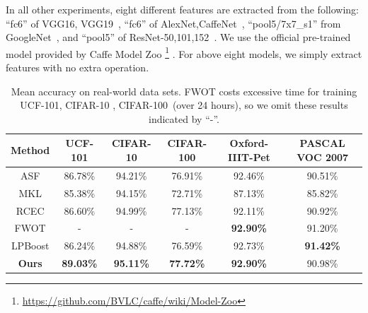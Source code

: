 \documentclass[10pt,twocolumn,letterpaper]{article}
\begin{document}
In all other experiments, eight different features are extracted from the following:
``fc6'' of VGG16, VGG19~\cite{chatfield2014return},
``fc6'' of AlexNet,CaffeNet~\cite{krizhevsky2012imagenet},
``pool5/7x7\_s1'' from GoogleNet~\cite{szegedy2015going},
and ``pool5'' of ResNet-50,101,152~\cite{he2015deep}.
We use the official pre-trained model provided by Caffe Model Zoo
\footnote{\url{https://github.com/BVLC/caffe/wiki/Model-Zoo}}
.
For above eight models, we simply extract features with no extra operation.

\begin{table}[t]
\centering
\begin{tabular}{|c|c|c|c|c|c|}
\hline
Method              & UCF-101          & CIFAR-10         & CIFAR-100        & Oxford-IIIT-Pet  & PASCAL VOC 2007    \\\hline
ASF                 & 86.78\%          & 94.21\%          & 76.91\%          & 92.46\%          &   90.51\%          \\
MKL                 & 85.38\%          & 94.15\%          & 72.71\%          & 87.13\%          &   85.82\%          \\
RCEC                & 86.60\%          & 94.99\%          & 77.13\%          & 92.11\%          &   90.92\%          \\
FWOT                & -                & -                & -                & \textbf{92.90\%} &   91.20\%          \\
LPBoost             & 86.24\%          & 94.88\%          & 76.59\%          & 92.73\%          &   \textbf{91.42\%} \\\hline
\textbf{Ours}       & \textbf{89.03\%} & \textbf{95.11\%} & \textbf{77.72\%} & \textbf{92.90\%} &   90.98\%          \\
\hline
\end{tabular}
\caption{Mean accuracy on real-world data sets.
FWOT costs excessive time for training UCF-101, CIFAR-10 , CIFAR-100~(over 24 hours),
so we omit these results indicated by ``-''.
}
\label{table:total_acc}
\end{table}
\end{document}
